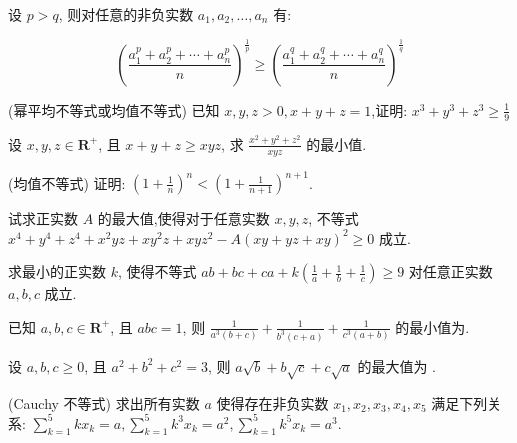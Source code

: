 \documentclass[a4paper , final]{ctexart}
\newenvironment{problem}[1]{%
  \item #1
  \par
  \vspace{8cm}
}{}
\begin{document}
设 $p>q$, 则对任意的非负实数 $a_1,a_2,\ldots,a_n$ 有:

\begin{equation*}
  \left(\frac{a_1^p+a_2^p+\cdots+a_n^p}{n}\right)^{\frac{1}{p}} \geq \left(\frac{a_1^q+a_2^q+\cdots+a_n^q}{n}\right)^{\frac{1}{q}}
\end{equation*}

\begin{problems}
  \begin{problem}
  {(幂平均不等式或均值不等式)
  已知 $x,y,z>0,x+y+z=1$,证明: $x^3+y^3+z^3\geq \frac{1}{9}$
  }
  \end{problem}

  \begin{problem}
  {
  设 $x,y,z\in\mathbf{R}^+$, 且 $x+y+z\ge xyz$, 求 $\frac{x^2+y^2+z^2}{xyz}$ 的最小值.
  }
  \end{problem}

  \begin{problem}
  {(均值不等式)
  证明: $\left(1+\frac{1}{n}\right)^n < \left(1+\frac{1}{n+1}\right)^{n+1}$.
  }
  \end{problem}

  \begin{problem}
  {
  试求正实数 $A$ 的最大值,使得对于任意实数 $x,y,z$, 不等式 $x^4+y^4+z^4+x^2yz+xy^2z+xyz^2-A(xy+yz+xy)^2\ge 0$ 成立.
  }
  \end{problem}

  \begin{problem}
  {
  求最小的正实数 $k$, 使得不等式 $ab+bc+ca+k\left(\frac{1}{a}+\frac{1}{b}+\frac{1}{c}\right)\geq 9$ 对任意正实数 $a,b,c$ 成立.
  }
  \end{problem}

  \begin{problem}
  {
  已知 $a,b,c\in \mathbf{R}^+$, 且 $abc=1$, 则 $\frac{1}{a^3(b+c)}+\frac{1}{b^3(c+a)}+\frac{1}{c^3(a+b)}$ 的最小值为\underline{\hspace{3cm}}.
  }
  \end{problem}

  \begin{problem}
  {
  设 $a,b,c\ge 0$, 且 $a^2+b^2+c^2=3$, 则 $a\sqrt{b}+b\sqrt{c}+c\sqrt{a}$ 的最大值为 \underline{\hspace{3cm}}.
  }
  \end{problem}

  \begin{problem}
  {(Cauchy 不等式)
  求出所有实数 $a$ 使得存在非负实数 $x_1,x_2,x_3,x_4,x_5$ 满足下列关系: $\sum_{k=1}^5 kx_k=a,\sum_{k=1}^5 k^3x_k =a^2,\sum_{k=1}^5 k^5x_k =a^3$.
  }
  \end{problem}


\end{problems}
\end{document}
